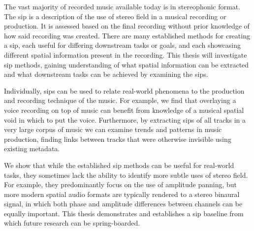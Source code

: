 \documentclass[main.tex]{subfiles}
\begin{document}
The vast majority of recorded music available today is in stereophonic format. The \gls{sip} is a description of the use of stereo field in a musical recording or production. It is assessed based on the final recording without prior knowledge of how said recording was created. There are many established methods for creating a \gls{sip}, each useful for differing downstream tasks or goals, and each showcasing different spatial information present in the recording. This thesis will investigate \gls{sip} methods, gaining understanding of what spatial information can be extracted and what downstream tasks can be achieved by examining the \glspl{sip}. 

Individually, \glspl{sip} can be used to relate real-world phenomena to the production and recording technique of the music. For example, we find that overlaying a voice recording on top of music can benefit from knowledge of a musical spatial void in which to put the voice. Furthermore, by extracting \glspl{sip} of all tracks in a very large corpus of music we can examine trends and patterns in music production, finding links between tracks that were otherwise invisible using existing metadata.


We show that while the established \gls{sip} methods can be useful for real-world tasks, they sometimes lack the ability to identify more subtle uses of stereo field. For example, they predominantly focus on the use of amplitude panning, but more modern spatial audio formats are typically rendered to a stereo binaural signal, in which both phase and amplitude differences between channels can be equally important. This thesis demonstrates and establishes a \gls{sip} baseline from which future research can be spring-boarded.
\end{document}
